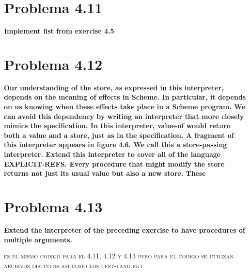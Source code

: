 \documentclass{article}
\begin{document}
\section{Problema 4.11}
\textbf{Implement list from exercise 4.5}
\section{Problema 4.12}
\textbf{ Our understanding of the store, as expressed in this interpreter,
depends on the meaning of effects in Scheme. In particular, it depends on us knowing
when these effects take place in a Scheme program. We can avoid this dependency by
writing an interpreter that more closely mimics the specification. In this interpreter,
value-of would return both a value and a store, just as in the specification. A fragment of this interpreter appears in figure 4.6. We call this a store-passing interpreter.
Extend this interpreter to cover all of the language EXPLICIT-REFS.
Every procedure that might modify the store returns not just its usual value but also a
new store. These}
\section{Problema 4.13}
\textbf{Extend the interpreter of the preceding exercise to have procedures of multiple arguments.}

\textsc{es el mismo codigo para el 4.11, 4.12 y 4.13 pero para el codigo se utilizan archivos distintos asi como los test-lang.rkt}
\end{document}
